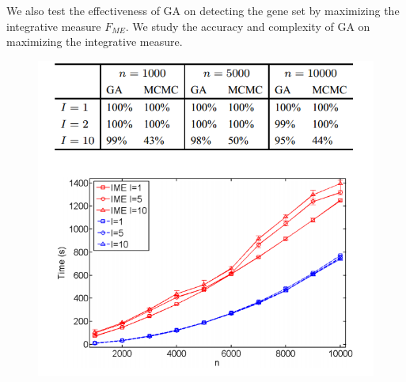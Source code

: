 \documentclass[xcolor=dvipsnames]{beamer}
\begin{document}
\begin{frame}
We also test the effectiveness of GA on detecting the gene set by maximizing the integrative measure $F_{ME}$. We study the accuracy and complexity of GA on maximizing the integrative measure.\\
\begin{figure}
\centering
\includegraphics[width=0.6\linewidth]{table.png}
\end{figure}
\end{frame}
\end{document}
